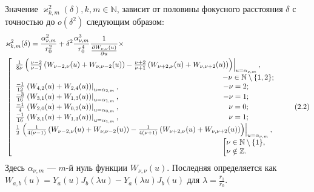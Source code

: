 \begin{theorem}
	Значение $\varkappa^2_{k,m}(\delta), k, m \in \mathbb{N}$, зависит от половины фокусного расстояния $\delta$ с точностью до $o(\delta^2)$ следующим образом:
{\small
\begin{align}
& \varkappa^2_{k,m}(\delta) = \frac{\alpha_{\nu, m}^2}{r_0^2} + \delta^2 \frac{\alpha_{\nu, m}^3}{r_0^4} \frac{1}{\frac{\partial W_{\nu,\nu}(u)}{\partial u}}\times \nonumber \\
& \left[
\begin{array}{ll}
\frac{1}{8 \nu} \left( \left. 
\frac{\nu-2}{\nu-1}
\left(
W_{\nu-2, \nu}(u) + W_{\nu, \nu-2}(u)
\right)- 
\frac{\nu+2}{\nu+1}
\left(
W_{\nu+2, \nu}(u) + W_{\nu, \nu+2}(u)
\right)\right)\right|_{u=\alpha_{\nu, m}}, \\
\hspace{28em}   -\nu \in \mathbb{N} \setminus \{1, 2\}; \\
\frac{-1}{12} \left. 
	\left(
	W_{4, 2}(u) + W_{2, 4}(u)
	\right)
\right|_{u=\alpha_{2, m}}, \hspace{14em} -\nu=2; \\
\frac{-3 }{16}
\left. 
	\left(
	W_{3, 1}(u) + W_{1, 3}(u)
	\right)
\right|_{u=\alpha_{1, m}}, \hspace{14em} -\nu=1; \\
\frac{-1}{4} \left. 
 \left( W_{2, 0}(u) + W_{0, 2}(u) \right)
\right|_{u=\alpha_{0, m}}, \hspace{14.75em} \nu=0;   \\
\frac{-1}{16} \left. \left( W_{3, 1}(u) + W_{1, 3}(u) \right)
\right|_{u=\alpha_{1, m}},    \hspace{14.75em} \nu=1;\\
\frac{1}{2} \left. \left(
\frac{1}{4(\nu-1)} \left( W_{\nu-2, \nu}(u) + W_{\nu, \nu-2}(u) \right) - \frac{1}{4(\nu+1)} \left( W_{\nu+2, \nu}(u) + W_{\nu, \nu+2}(u) \right)
\right) \right|_{u=\alpha_{\nu, m}}, \\
\hspace{28em}     \left[
\begin{aligned}
\nu &\in \mathbb{N} \setminus \{1\},\\
\nu &\notin \mathbb{Z}.
\end{aligned}
\right.
\end{array}
\right.
\tag{2.2}
\label{eq:valRing}
\end{align}
}
Здесь $\alpha_{\nu, m}$ --- $m$-й нуль функции $W_{\nu, \nu}(u)$. Последняя определяется как $W_{a, b}(u) = Y_a(u)J_b(\lambda u) - Y_a(\lambda u)J_b(u)$ для $\lambda = \frac{r_1}{r_0}$.
\end{theorem}
